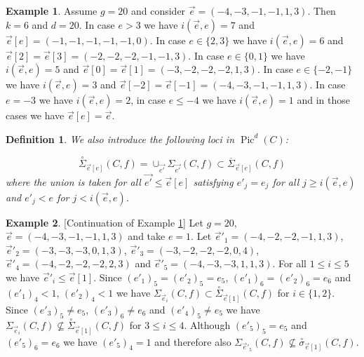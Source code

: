 \documentclass{article}
\DeclareMathOperator{\Pic}{Pic}
\newtheorem{definition}{Definition}
\theoremstyle{definition}
\newtheorem{example}{Example}
\theoremstyle{remark}
\begin{document}
\begin{example}\label{ex3.1}
Assume $g=20$ and consider $\overrightarrow {e}=(-4, -3, -1, -1, 1, 3)$.
Then $k=6$ and $d=20$.
In case $e>3$ we have $i(\overrightarrow {e},e)=7$ and $\overrightarrow {e}[e]=(-1,-1,-1,-1,-1,0)$.
In case $e \in \{2,3\}$ we have $i(\overrightarrow {e},e)=6$ and $\overrightarrow {e}[2]=\overrightarrow {e}[3]=(-2,-2,-2,-1,-1,3)$.
In case $e \in \{ 0,1 \}$ we have $i(\overrightarrow {e},e)=5$ and $\overrightarrow {e}[0]=\overrightarrow {e}[1]=(-3, -2, -2, -2, 1, 3)$.
In case $e \in \{-2, -1 \}$ we have $i(\overrightarrow {e},e)=3$ and $\overrightarrow {e}[-2]=\overrightarrow {e}[-1]=(-4, -3, -1, -1, 1,3)$.
In case $e =-3$ we have $i(\overrightarrow {e},e)=2$, in case $e \leq -4$ we have $i(\overrightarrow {e},e)=1$ and in those cases we have $\overrightarrow {e}[e]=\overrightarrow {e}$.
\end{example}

\begin{definition}\label{def2.1}
We also introduce the following loci in $\Pic^d(C)$:

\[
\overset{\circ}{ \Sigma}_{\overrightarrow{e}[e]}(C,f)=\cup_{\overrightarrow{e'}}\Sigma_{\overrightarrow{e'}}(C,f)\subset \overline{\Sigma}_{\overrightarrow{e}[e]}(C,f)
\]
where the union is taken for all $\overrightarrow{e'} \leq \overrightarrow{e}[e]$ satisfying $e'_j=e_j$ for all $j \geq i(\overrightarrow{e},e)$ and $e'_j<e$ for $j < i(\overrightarrow {e},e)$.
\end{definition}

\begin{example}\label{ex3.2}[Continuation of Example \ref{ex3.1}]
Let $g=20$, $\overrightarrow {e}=(-4,-3,-1,-1,1,3)$ and take $e=1$.
Let $\overrightarrow{e}'_1=(-4,-2,-2,-1,1,3)$, $\overrightarrow {e}'_2=(-3,-3,-3,0,1,3)$, $\overrightarrow {e}'_3=(-3,-2,-2,-2,0,4)$, $\overrightarrow {e}'_4=(-4,-2,-2,-2,2,3)$ and $\overrightarrow {e}'_5=(-4,-3,-3,1,1,3)$.
For all $1 \leq i \leq 5$ we have $\overrightarrow {e}'_i \leq \overrightarrow {e}[1]$.
Since $(e'_1)_5=(e'_2)_5=e_5$, $(e'_1)_6=(e'_2)_6=e_6$ and $(e'_1)_4 <1$, $(e'_2)_4<1$ we have $\Sigma_{\overrightarrow {e}_i}(C,f) \subset \overset { \circ}{\Sigma}_{\overrightarrow {e}[1]}(C,f)$ for $i \in \{ 1,2 \}$.
Since $(e'_3)_5 \neq e_5$, $(e'_3)_6 \neq e_6$ and $(e'_4)_5 \neq e_5$ we have $\Sigma _{\overrightarrow {e}_i}(C,f) \nsubseteq \overset {\circ}{\Sigma}_{\overrightarrow {e}[1]}(C,f)$ for $3 \leq i \leq 4$.
Although $(e'_5)_5=e_5$ and $(e'_5)_6=e_6$ we have $(e'_5)_4=1$ and therefore also $\Sigma _{\overrightarrow{e}'_5}(C,f) \nsubseteq \overset {\circ}{\sigma}_{\overrightarrow {e}[1]}(C,f)$. 
\end{example}
\end{document}
